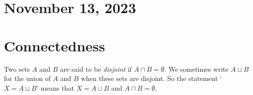\newpage
\section{November 13, 2023}
\section{Connectedness}

\begin{definition}[Disjoint]
    Two sets \( A \) and \( B \) are said to be \textit{disjoint} if \( A \cap B = \emptyset \). We sometimes write \( A \sqcup B \) for the union of \( A \) and \( B \) when these sets are disjoint. So the statement `\( X = A \sqcup B \)' means that \( X = A \cup B \) and \( A \cap B = \emptyset \).
\end{definition}